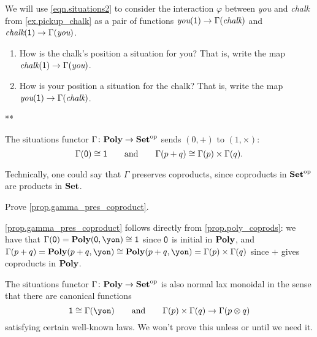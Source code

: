 \documentclass[Book-Poly]{subfiles}
\begin{document}
\begin{exercise}
We will use \eqref{eqn.situations2} to consider the interaction $\varphi$ between \textit{you} and \textit{chalk} from \cref{ex.pickup_chalk} as a pair of functions $\textit{you}(\textsf{1})\to\Gamma(\textit{chalk})$ and $\textit{chalk}(\textsf{1})\to\Gamma(\textit{you})$.
\begin{enumerate}
	\item How is the chalk's position a situation for you? That is, write the map $\textit{chalk}(\textsf{1})\to\Gamma(\textit{you})$.
	\item How is your position a situation for the chalk? That is, write the map $\textit{you}(\textsf{1})\to\Gamma(\textit{chalk})$.
\qedhere
\end{enumerate}
\begin{solution}
**
\end{solution}
\end{exercise}

\begin{proposition}\label{prop.gamma_pres_coproduct}
The situations functor $\Gamma\colon\mathbf{Poly}\to\mathbf{Set}^{\textnormal{op}}$ sends $(0,+)$ to $(1,\times)$:
\[
	\Gamma(\textsf{0})\cong\textsf{1}
	\qquad\text{and}\qquad
	\Gamma(p+q)\cong\Gamma(p)\times\Gamma(q).
\]
\end{proposition}
Technically, one could say that $\Gamma$ preserves coproducts, since coproducts in $\mathbf{Set}^{\textnormal{op}}$ are products in $\mathbf{Set}$.

\begin{exercise}
Prove \cref{prop.gamma_pres_coproduct}.
\begin{solution}
\cref{prop.gamma_pres_coproduct} follows directly from \cref{prop.poly_coprods}: we have that $\Gamma(\0) = \poly(\0,\yon) \iso \1$ since $\textsf{0}$ is initial in $\mathbf{Poly}$, and $\Gamma(p + q) = \poly(p+q,\yon) \iso \poly(p+q,\yon) = \Gamma(p) \times \Gamma(q)$ since $+$ gives coproducts in $\mathbf{Poly}$. 
\end{solution}
\end{exercise}

The situations functor $\Gamma\colon\mathbf{Poly}\to\mathbf{Set}^{\textnormal{op}}$ is also normal lax monoidal in the sense that there are canonical functions
\[
	\1\cong\Gamma(\yon)
	\qqand
	\Gamma(p)\times\Gamma(q)\to\Gamma(p\otimes q)
\]
satisfying certain well-known laws. We won't prove this unless or until we need it.



\end{document}
